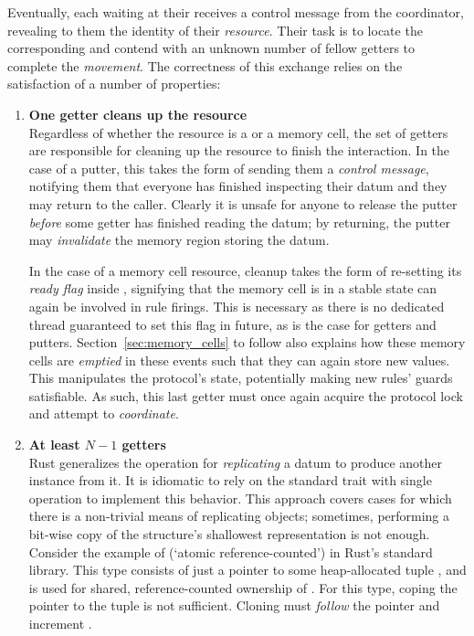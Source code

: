 Eventually, each  waiting at their  receives a control message from the coordinator, revealing to them the identity of their \textit{resource}. Their task is to locate the corresponding  and contend with an unknown number of fellow getters to complete the \textit{movement}. The correctness of this exchange relies on the satisfaction of a number of properties:
\begin{enumerate}
	\item \textbf{One getter cleans up the resource}\\
	Regardless of whether the resource is a  or a memory cell, the set of getters are responsible for cleaning up the resource to finish the interaction. In the case of a putter, this takes the form of sending them a \textit{control message}, notifying them that everyone has finished inspecting their datum and they may return to the caller. Clearly it is unsafe for anyone to release the putter \textit{before} some getter has finished reading the datum; by returning, the putter may \textit{invalidate} the memory region storing the datum.
	
	In the case of a memory cell resource, cleanup takes the form of re-setting its \textit{ready flag} inside , signifying that the memory cell is in a stable state can again be involved in rule firings. This is necessary as there is no dedicated thread guaranteed to set this flag in future, as is the case for getters and putters. Section~\ref{sec:memory_cells} to follow also explains how these memory cells are \textit{emptied} in these events such that they can again store new values. This manipulates the protocol's state, potentially making new rules' guards satisfiable. As such, this last getter must once again acquire the protocol lock and attempt to \textit{coordinate}.
	
	\item \textbf{At least $N-1$ getters }\\
	Rust generalizes the operation for \textit{replicating} a datum to produce another instance from it. It is idiomatic to rely on the standard trait  with single operation  to implement this behavior. This approach covers cases for which there is a non-trivial means of replicating objects; sometimes, performing a bit-wise copy of the structure's shallowest representation is not enough. Consider the example of  (`atomic reference-counted') in Rust's standard library. This type consists of just a pointer to some heap-allocated tuple , and is used for shared, reference-counted ownership of . For this type, coping the pointer to the tuple is not sufficient. Cloning must \textit{follow} the pointer and increment .
	

\end{enumerate}

